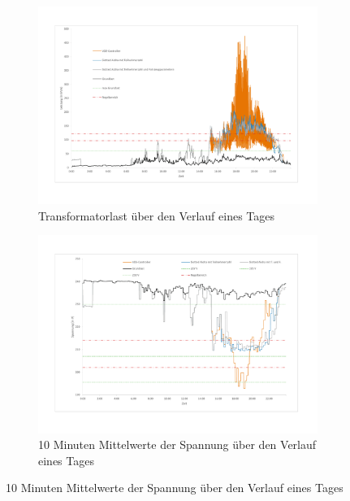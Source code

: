 \begin{figure}
	\begin{subfigure}{\linewidth}
		\includegraphics[scale=0.5]{img/ohneTrafo/TrafoLast4.pdf}
		\caption{Transformatorlast über den Verlauf eines Tages}
		\label{Abb_oT_TrafoLast}
	\end{subfigure}
	\begin{subfigure}{\linewidth}
		\includegraphics[scale=0.5]{img/ohneTrafo/Spannung3.pdf}
		\caption{10 Minuten Mittelwerte der Spannung über den Verlauf eines Tages}
		\label{Abb_oT_Spannung}
	\end{subfigure}
\end{figure}
